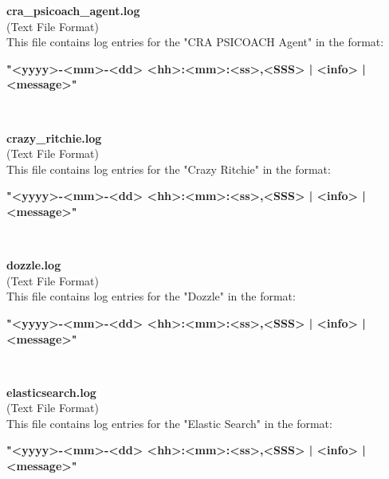 \begin{description}
\begin{addmargin}[0em]{0em}
    \label{cra_psicoach_agent.log}
    \begin{addmargin}[1em]{0em} %
        \textbf{cra\_psicoach\_agent.log}\\
        (Text File Format)\\
        This file contains log entries for the "CRA PSICOACH Agent" in the format:
        \begin{addmargin}[1em]{0em}
            \textbf{"<yyyy>-<mm>-<dd> <hh>:<mm>:<ss>,<SSS> | <info> | <message>"}
        \end{addmargin}
    \end{addmargin} %
    \textbf{\\}

    \label{crazy_ritchie.log}
    \begin{addmargin}[1em]{0em} %
        \textbf{crazy\_ritchie.log}\\
        (Text File Format)\\
        This file contains log entries for the "Crazy Ritchie" in the format:
        \begin{addmargin}[1em]{0em}
            \textbf{"<yyyy>-<mm>-<dd> <hh>:<mm>:<ss>,<SSS> | <info> | <message>"}
        \end{addmargin}
    \end{addmargin} %
    \textbf{\\}

    \label{dozzle.log}
    \begin{addmargin}[1em]{0em} %
        \textbf{dozzle.log}\\
        (Text File Format)\\
        This file contains log entries for the "Dozzle" in the format:
        \begin{addmargin}[1em]{0em}
            \textbf{"<yyyy>-<mm>-<dd> <hh>:<mm>:<ss>,<SSS> | <info> | <message>"}
        \end{addmargin}
    \end{addmargin} %
    \textbf{\\}

    \label{elasticsearch.log}
    \begin{addmargin}[1em]{0em} %
        \textbf{elasticsearch.log}\\
        (Text File Format)\\
        This file contains log entries for the "Elastic Search" in the format:
        \begin{addmargin}[1em]{0em}
            \textbf{"<yyyy>-<mm>-<dd> <hh>:<mm>:<ss>,<SSS> | <info> | <message>"}
        \end{addmargin}
    \end{addmargin} %
    \textbf{\\}


\end{addmargin}
\end{description}
